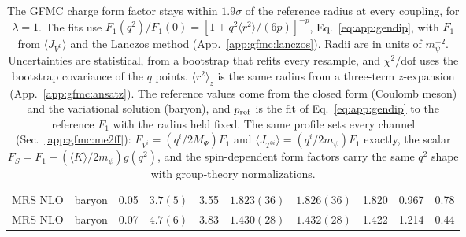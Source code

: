 \begin{table}[t]
\begin{tabular}{lllccccccc}
MRS NLO & baryon & 0.05 & $3.7(5)$ & 3.55 & $1.823(36)$ & $1.826(36)$ & 1.820 & 0.967 & 0.78\\
MRS NLO & baryon & 0.07 & $4.7(6)$ & 3.83 & $1.430(28)$ & $1.432(28)$ & 1.422 & 1.214 & 0.44\\
\hline\hline
\end{tabular}
\caption{The GFMC charge form factor stays within $1.9\sigma$ of the reference radius at every coupling, for $\lambda=1$.
The fits use $F_1(q^2)/F_1(0)=[1+q^2\langle r^2\rangle/(6p)]^{-p}$, Eq.~\eqref{eq:app:gendip}, with $F_1$ from
$\langle J_{V^0}\rangle$ and the Lanczos method (App.~\ref{app:gfmc:lanczos}). Radii are in units of $m_\psi^{-2}$.
Uncertainties are statistical, from a bootstrap that refits every resample, and $\chi^2/\mathrm{dof}$ uses the bootstrap
covariance of the $q$ points. $\langle r^2\rangle_z$ is the same radius from a three-term $z$-expansion
(App.~\ref{app:gfmc:ansatz}). The reference values come from the closed form (Coulomb meson) and the variational solution
(baryon), and $p_{\rm ref}$ is the fit of Eq.~\eqref{eq:app:gendip} to the reference $F_1$ with the radius held fixed.
The same profile sets every channel (Sec.~\ref{app:gfmc:me2ff}): $F_{V^i}=(q^i/2M_\Psi)F_1$ and
$\langle J_{T^{0i}}\rangle=(q^i/2m_\psi)F_1$ exactly, the scalar $F_S=F_1-(\langle K\rangle/2m_\psi)g(q^2)$, and the
spin-dependent form factors carry the same $q^2$ shape with group-theory normalizations.}
\label{tab:FF_fits}
\end{table}
